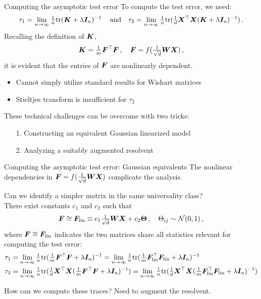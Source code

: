 \documentclass[10pt, aspectratio=169]{beamer}
\begin{document}
\begin{frame}{Computing the asymptotic test error}
To compute the test error, we need:%
$$ \tau_1 = \lim_{n\to\infty} \tfrac{1}{n}\text{tr}({\boldsymbol K}+\lambda {\boldsymbol I}_n)^{-1}\,\quad \text{and} \quad \tau_2 = \lim_{n\to\infty} \tfrac{1}{n}\text{tr}(\tfrac{1}{d}{\boldsymbol X}^\top {\boldsymbol X} ({\boldsymbol K}+\lambda {\boldsymbol I}_n)^{-1})\,.$$
\pause
Recalling the definition of ${\boldsymbol K}$,
$$ {\boldsymbol K} = \tfrac{1}{m}{\boldsymbol F}^\top {\boldsymbol F}\,,\quad {\boldsymbol F} = f(\tfrac{1}{\sqrt{d}}{\boldsymbol W}{\boldsymbol X})\,,$$
it is evident that the entries of ${\boldsymbol F}$ are nonlinearly dependent. 
\begin{itemize}
    \item Cannot simply utilize standard results for Wishart matrices
    \item Stieltjes transform is insufficient for $\tau_2$%
\end{itemize}
\pause
These technical challenges can be overcome with two tricks:
\begin{itemize}
    \item[1.] Constructing an equivalent Gaussian linearized model
    \item[2.] Analyzing a suitably augmented resolvent
\end{itemize}
\end{frame}
\begin{frame}[t]{Computing the asymptotic test error: Gaussian equivalents}
The nonlinear dependencies in ${\boldsymbol F} = f(\tfrac{1}{\sqrt{d}}{\boldsymbol W}{\boldsymbol X})$ complicate the analysis.

Can we identify a simpler matrix in the same universality class?
\pause
\\

There exist constants $c_1$ and $c_2$ such that
$${\boldsymbol F} \cong {\boldsymbol F}_\text{lin} \equiv c_1 \tfrac{1}{\sqrt{d}}{\boldsymbol W}{\boldsymbol X} + c_2 \bm{\Theta}\,,\quad \Theta_{ij}\sim\mathcal{N}(0,1)\,,$$
where ${\boldsymbol F} \cong {\boldsymbol F}_\text{lin}$ indicates the two matrices share all statistics relevant for computing the test error:
\begin{align*}
    \tau_1 &= \lim_{n\to\infty} \tfrac{1}{n}\text{tr}(\tfrac{1}{m}{\boldsymbol F}^\top {\boldsymbol F}+\lambda {\boldsymbol I}_n)^{-1} = \lim_{n\to\infty} \tfrac{1}{n}\text{tr}(\tfrac{1}{m}{\boldsymbol F}_{\text{lin}}^\top {\boldsymbol F}_{\text{lin}}+\lambda {\boldsymbol I}_n)^{-1}\\
    \tau_2 &= \lim_{n\to\infty} \tfrac{1}{n}\text{tr}(\tfrac{1}{d}{\boldsymbol X}^\top {\boldsymbol X} (\tfrac{1}{m}{\boldsymbol F}^\top {\boldsymbol F}+\lambda {\boldsymbol I}_n)^{-1}) = \lim_{n\to\infty} \tfrac{1}{n}\text{tr}(\tfrac{1}{d}{\boldsymbol X}^\top {\boldsymbol X} (\tfrac{1}{m}{\boldsymbol F}_{\text{lin}}^\top {\boldsymbol F}_{\text{lin}}+\lambda {\boldsymbol I}_n)^{-1})
\end{align*}
\pause

How can we compute these traces? Need to augment the resolvent.
\end{frame}
\end{document}
